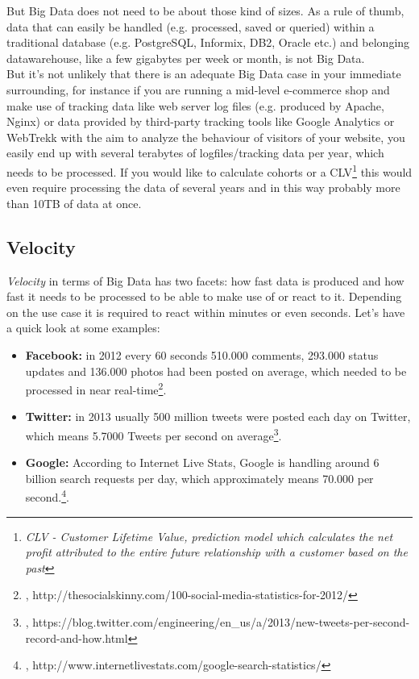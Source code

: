 But Big Data does not need to be about those kind of sizes. As a rule of thumb, data that can easily be handled (e.g. processed, saved or queried) within a traditional database (e.g. PostgreSQL, Informix, DB2, Oracle etc.) and belonging datawarehouse, like a few gigabytes per week or month, is not Big Data. \\
But it's not unlikely that there is an adequate Big Data case in your immediate surrounding, for instance if you are running a mid-level e-commerce shop and make use of tracking data like web server log files (e.g. produced by Apache, Nginx) or data provided by third-party tracking tools like Google Analytics or WebTrekk with the aim to analyze the behaviour of visitors of your website, you easily end up with several terabytes of logfiles/tracking data per year, which needs to be processed. If you would like to calculate cohorts or a CLV\footnote{\textit{CLV - Customer Lifetime Value, prediction model which calculates the net profit attributed to the entire future relationship with a customer based on the past}} this would even require processing the data of several years and in this way probably more than 10TB of data at once.


\subsection{Velocity}
\label{bd_vs_velocity}
\textit{Velocity} in terms of Big Data has two facets: how fast data is produced and how fast it needs to be processed to be able to make use of or react to it. Depending on the use case it is required to react within minutes or even seconds. Let's have a quick look at some examples: 

\begin{itemize}
	\item \textbf{Facebook:} in 2012 every 60 seconds 510.000 comments, 293.000 status updates and 136.000 photos had been posted on average, which needed to be processed in near real-time\footnote{\cite{TSSFP}, http://thesocialskinny.com/100-social-media-statistics-for-2012/}.
	\item \textbf{Twitter:} in 2013 usually 500 million tweets were posted each day on Twitter, which means 5.7000 Tweets per second on average\footnote{\cite{TWTTPS}, https://blog.twitter.com/engineering/en\_us/a/2013/new-tweets-per-second-record-and-how.html}.
	\item \textbf{Google:} According to Internet Live Stats, Google is handling around 6 billion search requests per day, which approximately means 70.000 per second.\footnote{\cite{ILSGS}, http://www.internetlivestats.com/google-search-statistics/}.\\
\end{itemize}

